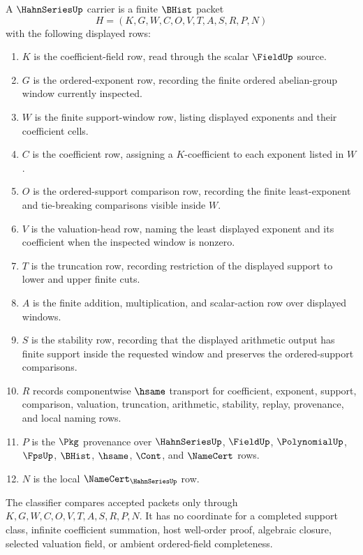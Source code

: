 \begin{definition}
\label{def:hahn-series-carrier}
A $\HahnSeriesUp$ carrier is a finite $\BHist$ packet
$$
H=(K,G,W,C,O,V,T,A,S,R,P,N)
$$
with the following displayed rows:
\begin{enumerate}
\item $K$ is the coefficient-field row, read through the scalar $\FieldUp$ source.
\item $G$ is the ordered-exponent row, recording the finite ordered abelian-group window currently inspected.
\item $W$ is the finite support-window row, listing displayed exponents and their coefficient cells.
\item $C$ is the coefficient row, assigning a $K$-coefficient to each exponent listed in $W$.
\item $O$ is the ordered-support comparison row, recording the finite least-exponent and tie-breaking comparisons visible inside $W$.
\item $V$ is the valuation-head row, naming the least displayed exponent and its coefficient when the inspected window is nonzero.
\item $T$ is the truncation row, recording restriction of the displayed support to lower and upper finite cuts.
\item $A$ is the finite addition, multiplication, and scalar-action row over displayed windows.
\item $S$ is the stability row, recording that the displayed arithmetic output has finite support inside the requested window and preserves the ordered-support comparisons.
\item $R$ records componentwise $\hsame$ transport for coefficient, exponent, support, comparison, valuation, truncation, arithmetic, stability, replay, provenance, and local naming rows.
\item $P$ is the $\Pkg$ provenance over $\HahnSeriesUp$, $\FieldUp$, $\PolynomialUp$, $\FpsUp$, $\BHist$, $\hsame$, $\Cont$, and $\NameCert$ rows.
\item $N$ is the local $\NameCert_{\HahnSeriesUp}$ row.
\end{enumerate}
The classifier compares accepted packets only through $K,G,W,C,O,V,T,A,S,R,P,N$. It has no coordinate for a completed support class, infinite coefficient summation, host well-order proof, algebraic closure, selected valuation field, or ambient ordered-field completeness.
\end{definition}

